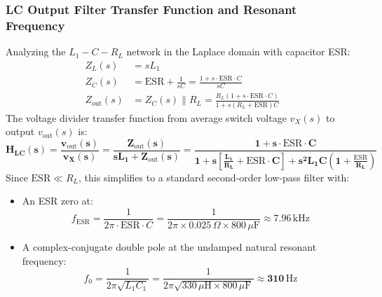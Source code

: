 \documentclass[11pt,a4paper]{article}
\begin{document}
\subsubsection{LC Output Filter Transfer Function and Resonant Frequency}
Analyzing the $L_1-C-R_L$ network in the Laplace domain with capacitor ESR:
\begin{align}
    Z_L(s) &= s L_1 \\
    Z_C(s) &= \mathrm{ESR} + \frac{1}{sC} = \frac{1 + s \cdot \mathrm{ESR} \cdot C}{sC} \\
    Z_{\mathrm{out}}(s) &= Z_C(s) \parallel R_L = \frac{R_L(1 + s \cdot \mathrm{ESR} \cdot C)}{1 + s(R_L + \mathrm{ESR})C}
\end{align}
The voltage divider transfer function from average switch voltage $v_X(s)$ to output $v_{\mathrm{out}}(s)$ is:
\begin{equation}
    \mathbf{H_{LC}(s) = \frac{v_{\mathrm{out}}(s)}{v_X(s)} = \frac{Z_{\mathrm{out}}(s)}{sL_1 + Z_{\mathrm{out}}(s)} = \frac{1 + s \cdot \mathrm{ESR} \cdot C}{1 + s \left[\frac{L_1}{R_L} + \mathrm{ESR}\cdot C\right] + s^2 L_1 C \left(1 + \frac{\mathrm{ESR}}{R_L}\right)}}
\end{equation}
Since $\mathrm{ESR} \ll R_L$, this simplifies to a standard second-order low-pass filter with:
\begin{itemize}
    \item An ESR zero at:
    \begin{equation}
        f_{\mathrm{ESR}} = \frac{1}{2\pi \cdot \mathrm{ESR} \cdot C} = \frac{1}{2\pi \times 0.025\,\Omega \times 800\,\mu\mathrm{F}} \approx \mathbf{7.96\,\mathrm{kHz}}
    \end{equation}
    \item A complex-conjugate double pole at the undamped natural resonant frequency:
    \begin{equation}
        f_0 = \frac{1}{2\pi \sqrt{L_1 C_1}} = \frac{1}{2\pi \sqrt{330\,\mu\mathrm{H} \times 800\,\mu\mathrm{F}}} \approx \mathbf{310\,\mathrm{Hz}}
    \end{equation}
\end{itemize}
\end{document}
